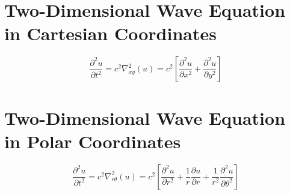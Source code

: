 \chapter{Two-Dimensional Wave Equation in Cartesian Coordinates}
\begin{comment}
Physics Archives
\end{comment}
$$\frac{\partial^2u}{\partial t^2} = c^2\nabla^2_{xy}(u) = c^2\left[\frac{\partial^2u}{\partial x^2} + \frac{\partial^2u}{\partial y^2}\right]$$
\chapter{Two-Dimensional Wave Equation in Polar Coordinates}
\begin{comment}
Physics Archives
\end{comment}
$$\frac{\partial^2u}{\partial t^2} = c^2\nabla^2_{r\theta}(u) = c^2\left[\frac{\partial^2u}{\partial r^2} + \frac{1}{r}\frac{\partial u}{\partial r} + \frac{1}{r^2}\frac{\partial^2u}{\partial \theta^2}\right]$$

